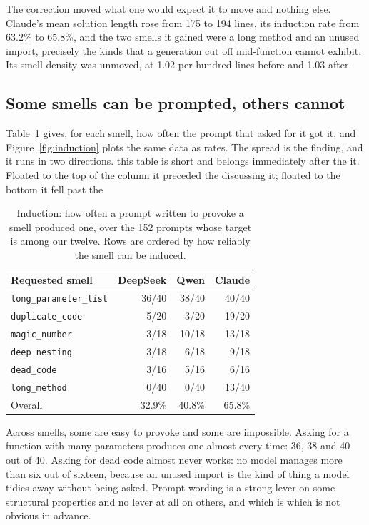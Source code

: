 \documentclass[10pt,a4paper,twocolumn]{article}
\begin{document}
The correction moved what one would expect it to move and nothing else. Claude's
mean solution length rose from 175 to 194 lines, its induction rate from 63.2\%
to 65.8\%, and the two smells it gained were a long method and an unused import,
precisely the kinds that a generation cut off mid-function cannot exhibit. Its
smell density was unmoved, at 1.02 per hundred lines before and 1.03 after.

\subsection{Some smells can be prompted, others cannot}

Table~\ref{tab:induction} gives, for each smell, how often the prompt that asked
for it got it, and Figure~\ref{fig:induction} plots the same data as rates. The
spread is the finding, and it runs in two directions. %
this table is short and belongs immediately after the %
it. Floated to the top of the column it preceded the %
discussing it; floated to the bottom it fell past the %
\begin{table}[H] \centering \small \begin{tabular}{lrrr} \toprule Requested
smell & \mbox{DeepSeek} & Qwen & Claude \\ \midrule
\texttt{long\_parameter\_list} & 36/40 & 38/40 & 40/40 \\
\texttt{duplicate\_code} & 5/20 & 3/20 & 19/20 \\ \texttt{magic\_number} & 3/18
& 10/18 & 13/18 \\ \texttt{deep\_nesting} & 3/18 & 6/18 & 9/18 \\
\texttt{dead\_code} & 3/16 & 5/16 & 6/16 \\ \texttt{long\_method} & 0/40 & 0/40
& 13/40 \\ \midrule Overall & 32.9\% & 40.8\% & 65.8\% \\ \bottomrule
\end{tabular} \caption{Induction: how often a prompt written to provoke a smell
produced one, over the 152 prompts whose target is among our twelve. Rows are
ordered by how reliably the smell can be induced.} \label{tab:induction}
\end{table} Across smells, some are easy to provoke and some are impossible.
Asking for a function with many parameters produces one almost every time: 36,
38 and 40 out of 40. Asking for dead code almost never works: no model manages
more than six out of sixteen, because an unused import is the kind of thing a
model tidies away without being asked. Prompt wording is a strong lever on some
structural properties and no lever at all on others, and which is which is not
obvious in advance.
\end{document}
